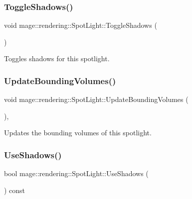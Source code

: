 \subsubsection{\texorpdfstring{Toggle\+Shadows()}{ToggleShadows()}}
{\footnotesize\ttfamily void mage\+::rendering\+::\+Spot\+Light\+::\+Toggle\+Shadows (\begin{DoxyParamCaption}{ }\end{DoxyParamCaption})\hspace{0.3cm}{\ttfamily [noexcept]}}

Toggles shadows for this spotlight. \hypertarget{classmage_1_1rendering_1_1_spot_light_aa225a105edf22a1a430a1c3aa42bc490}{}\label{classmage_1_1rendering_1_1_spot_light_aa225a105edf22a1a430a1c3aa42bc490} 
\subsubsection{\texorpdfstring{Update\+Bounding\+Volumes()}{UpdateBoundingVolumes()}}
{\footnotesize\ttfamily void mage\+::rendering\+::\+Spot\+Light\+::\+Update\+Bounding\+Volumes (\begin{DoxyParamCaption}{ }\end{DoxyParamCaption})\hspace{0.3cm}{\ttfamily [private]}, {\ttfamily [noexcept]}}

Updates the bounding volumes of this spotlight. \hypertarget{classmage_1_1rendering_1_1_spot_light_a5081e3b99bd869d6c241b48666917cd4}{}\label{classmage_1_1rendering_1_1_spot_light_a5081e3b99bd869d6c241b48666917cd4} 
\subsubsection{\texorpdfstring{Use\+Shadows()}{UseShadows()}}
{\footnotesize\ttfamily bool mage\+::rendering\+::\+Spot\+Light\+::\+Use\+Shadows (\begin{DoxyParamCaption}{ }\end{DoxyParamCaption}) const\hspace{0.3cm}{\ttfamily [noexcept]}}

